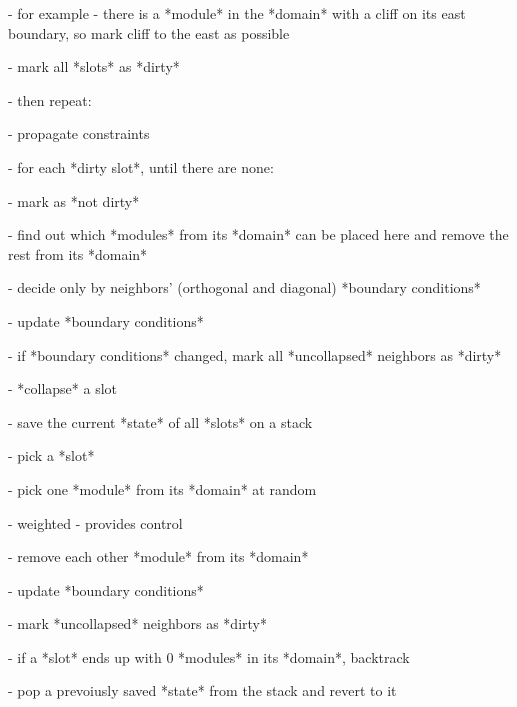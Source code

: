 - for example - there is a *module* in the *domain* with a cliff on its east boundary, so mark cliff to the east as possible

- mark all *slots* as *dirty*

- then repeat:

- propagate constraints

- for each *dirty slot*, until there are none:

- mark as *not dirty*

- find out which *modules* from its *domain* can be placed here and remove the rest from its *domain*

- decide only by neighbors' (orthogonal and diagonal) *boundary conditions*

- update *boundary conditions*

- if *boundary conditions* changed, mark all *uncollapsed* neighbors as *dirty*

- *collapse* a slot

- save the current *state* of all *slots* on a stack

- pick a *slot*

- pick one *module* from its *domain* at random

- weighted - provides control

- remove each other *module* from its *domain*

- update *boundary conditions*

- mark *uncollapsed* neighbors as *dirty*

- if a *slot* ends up with 0 *modules* in its *domain*, backtrack

- pop a prevoiusly saved *state* from the stack and revert to it

- remove the previously chosen *module* from the *domain* of the previously *collapsed slot*


- Which slot to collapse?

- fail fast approach

- prioritize slot with least options

- changed to slot with least entropy, because that's more accurate

- slots near most constraining modules were prioritized, making them more common and leading to repetitive terrain features

- better to just collapse a random slot

- in the end still weighted by entropy

- at first I tried to prefer slots with more entropy

